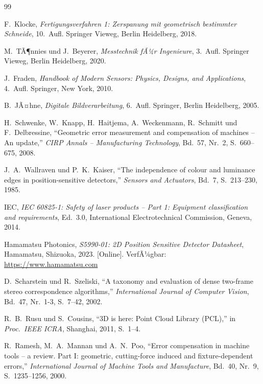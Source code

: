 ﻿\documentclass[a4paper,12pt]{article}
\theoremstyle{definition}
\begin{document}
\begin{thebibliography}{99}

F.~Klocke, \textit{Fertigungsverfahren 1: Zerspanung mit geometrisch bestimmter Schneide},
10.~Aufl. Springer Vieweg, Berlin Heidelberg, 2018.

M.~TÃ¶nnies und J.~Beyerer, \textit{Messtechnik fÃ¼r Ingenieure},
3.~Aufl. Springer Vieweg, Berlin Heidelberg, 2020.

J.~Fraden, \textit{Handbook of Modern Sensors: Physics, Designs, and Applications},
4.~Aufl. Springer, New York, 2010.

B.~JÃ¤hne, \textit{Digitale Bildverarbeitung},
6.~Aufl. Springer, Berlin Heidelberg, 2005.

H.~Schwenke, W.~Knapp, H.~Haitjema, A.~Weckenmann, R.~Schmitt und F.~Delbressine,
``Geometric error measurement and compensation of machines -- An update,''
\textit{CIRP Annals -- Manufacturing Technology}, Bd.~57, Nr.~2,
S.~660--675, 2008.

J.~A.~Wallraven und P.~K.~Kaiser, ``The independence of colour and luminance edges
in position-sensitive detectors,'' \textit{Sensors and Actuators}, Bd.~7, S.~213--230, 1985.

IEC, \textit{IEC 60825-1: Safety of laser products -- Part 1: Equipment classification and requirements},
Ed.~3.0, International Electrotechnical Commission, Geneva, 2014.

Hamamatsu Photonics, \textit{S5990-01: 2D Position Sensitive Detector Datasheet},
Hamamatsu, Shizuoka, 2023. [Online]. VerfÃ¼gbar: \url{https://www.hamamatsu.com}

D.~Scharstein und R.~Szeliski, ``A taxonomy and evaluation of dense two-frame
stereo correspondence algorithms,'' \textit{International Journal of Computer Vision},
Bd.~47, Nr.~1-3, S.~7--42, 2002.

R.~B.~Rusu und S.~Cousins, ``3D is here: Point Cloud Library (PCL),''
in \textit{Proc.\ IEEE ICRA}, Shanghai, 2011, S.~1--4.

R.~Ramesh, M.~A.~Mannan und A.~N.~Poo, ``Error compensation in machine tools -- a review.
Part I: geometric, cutting-force induced and fixture-dependent errors,''
\textit{International Journal of Machine Tools and Manufacture},
Bd.~40, Nr.~9, S.~1235--1256, 2000.


\end{thebibliography}
\end{document}
